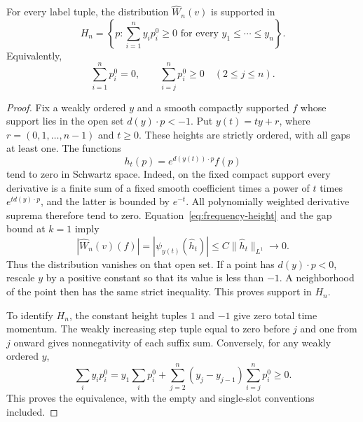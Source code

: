 \begin{proposition}\label{prop:half-support}
For every label tuple, the distribution $\widehat W_n(v)$ is supported in
\[
 H_n=\left\{p:\sum_{i=1}^n y_i p_i^0\geq0
                    \text{ for every }y_1\leq\cdots\leq y_n\right\}.
\]
Equivalently,
\[
 \sum_{i=1}^n p_i^0=0,\qquad
 \sum_{i=j}^n p_i^0\geq0\quad(2\leq j\leq n).
\]
\end{proposition}
\begin{proof}
Fix a weakly ordered $y$ and a smooth compactly supported $f$ whose support
lies in the open set $d(y)\cdot p<-1$. Put
$y(t)=ty+r$, where $r=(0,1,\ldots,n-1)$ and $t\geq0$.
These heights are strictly ordered, with all gaps at least one. The
functions
\[
 h_t(p)=e^{d(y(t))\cdot p}f(p)
\]
tend to zero in Schwartz space. Indeed, on the fixed compact support every
derivative is a finite sum of a fixed smooth coefficient times a power of
$t$ times $e^{t d(y)\cdot p}$, and the latter is bounded by $e^{-t}$.
All polynomially weighted derivative suprema therefore tend to zero.
Equation~\eqref{eq:frequency-height} and the gap bound at $k=1$ imply
\[
 |\widehat W_n(v)(f)|
  =|\psi_{y(t)}(\widehat h_t)|
  \leq C\|\widehat h_t\|_{L^1}\longrightarrow0.
\]
Thus the distribution vanishes on that open set. If a point has
$d(y)\cdot p<0$, rescale $y$ by a positive constant so that its value is
less than $-1$. A neighborhood of the point then has the same strict
inequality. This proves support in $H_n$.

To identify $H_n$, the constant height tuples $1$ and $-1$ give zero total
time momentum. The weakly increasing step tuple equal to zero before $j$
and one from $j$ onward gives nonnegativity of each suffix sum. Conversely,
for any weakly ordered $y$,
\[
 \sum_i y_i p_i^0
 =y_1\sum_i p_i^0+
       \sum_{j=2}^n(y_j-y_{j-1})\sum_{i=j}^n p_i^0\geq0.
\]
This proves the equivalence, with the empty and single-slot conventions
included.
\end{proof}


